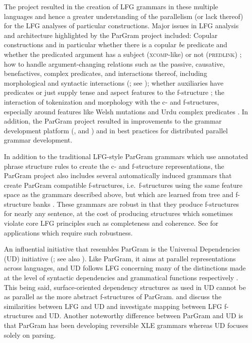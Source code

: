 \documentclass[output=paper,hidelinks]{langscibook}
\begin{document}
The project resulted in the creation of  LFG grammars in these multiple languages and hence a greater understanding of the parallelism (or lack thereof) for the LFG analyses of particular constructions. Major issues in LFG analysis and architecture highlighted by the ParGram project included: Copular constructions and in particular whether there is a copular {\em be} predicate and whether the predicated argument has a subject (\textsc{xcomp}-like) or not (\textsc{predlink}) \citep{dalrympleetal04copular,attia08}; how to handle argument-changing relations such as the passive, causative, benefactives, complex predicates, and interactions thereof, including morphological and syntactic interactions (\cite{boegelbuttking2019}; see ); whether auxiliaries have predicates or just supply tense and aspect features to the f-structure \citep{buttetal96,dyvik99}; the interaction of tokenization and morphology with the c- and f-structures, especially around features like Welsh mutations \citep{mittendorfsadler06} and Urdu complex predicates \citep{boegelbuttking2019}.
In addition, the ParGram project resulted in improvements to the grammar development platform (,  and ) and in best practices for distributed parallel grammar development.


In addition to the traditional LFG-style ParGram grammars which use annotated phrase structure rules to create the c- and f-structure representations, the ParGram project also includes several automatically induced grammars that create ParGram compatible f-structures, i.e.\ f-structures using the same feature space as the grammars described above, but which are learned from tree and f-structure banks \citep{cahilletal02}. These grammars are robust in that they produce f-structures for nearly any sentence, at the cost of producing structures which sometimes violate core LFG principles such as completeness and coherence. See  for applications which require such robustness.

An influential initiative that resembles ParGram is the Universal Dependencies (UD) initiative (\cite{universaldep13}; see also ). Like ParGram, it aims at parallel representations across languages, and  UD follows LFG concerning many of the distinctions made at the level of syntactic dependencies and grammatical functions respectively \citep{USD2014}. This being said, surface-oriented dependency structures as used in UD cannot be as parallel as the  more abstract f-structures of ParGram. \cite{korsak18} and \cite{prz:pat:19:lre} discuss the similarities between LFG and UD and investigate mapping between LFG f-structures and UD. Another noteworthy difference between ParGram and UD is that ParGram has been developing reversible XLE grammars whereas UD focuses solely on parsing.
\end{document}

